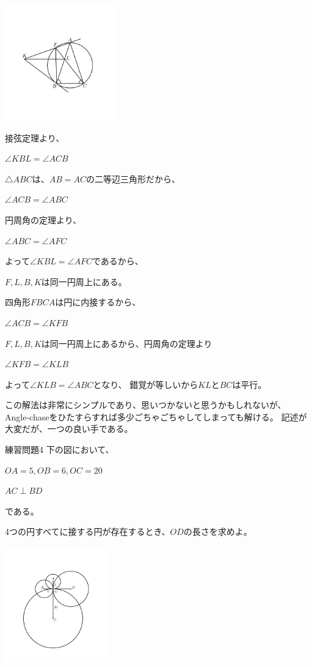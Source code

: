 \documentclass[uplatex,fleqn]{jsbook}
\begin{document}
\begin{answer}
    \includegraphics[clip,height=5cm]{figures/practice3.pdf}

    接弦定理より、

    $\angle KBL=\angle ACB$

    $\triangle ABC$は、$AB=AC$の二等辺三角形だから、

    $\angle ACB=\angle ABC$

    円周角の定理より、

    $\angle ABC=\angle AFC$

    よって$\angle KBL=\angle AFC$であるから、

    $F,L,B,K$は同一円周上にある。

    四角形$FBCA$は円に内接するから、

    $\angle ACB=\angle KFB$

    $F,L,B,K$は同一円周上にあるから、円周角の定理より

    $\angle KFB=\angle KLB$

    よって$\angle KLB=\angle ABC$となり、
    錯覚が等しいから$KL$と$BC$は平行。
\end{answer}
この解法は非常にシンプルであり、思いつかないと思うかもしれないが、
Angle-chaseをひたすらすれば多少ごちゃごちゃしてしまっても解ける。
記述が大変だが、一つの良い手である。

\begin{problem}{練習問題4}
    下の図において、

    $OA=5,OB=6,OC=20$

    $AC\perp BD$

    である。

    4つの円すべてに接する円が存在するとき、$OD$の長さを求めよ。

    \includegraphics[clip,height=5cm]{figures/practice4.pdf}
\end{problem}
\end{document}
